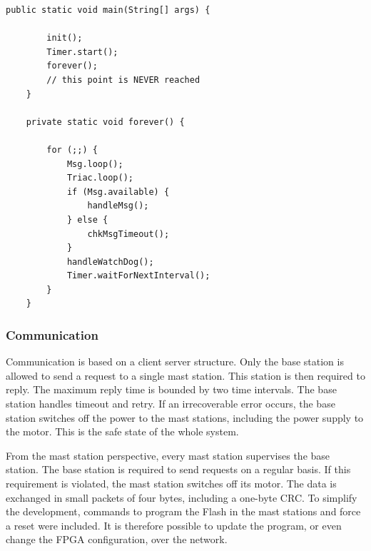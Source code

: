 \begin{lstlisting}[float,caption=Simplified program structure,
label=lst:results:main]
    public static void main(String[] args) {

        init();
        Timer.start();
        forever();
        // this point is NEVER reached
    }

    private static void forever() {

        for (;;) {
            Msg.loop();
            Triac.loop();
            if (Msg.available) {
                handleMsg();
            } else {
                chkMsgTimeout();
            }
            handleWatchDog();
            Timer.waitForNextInterval();
        }
    }
\end{lstlisting}

\subsubsection{Communication}

Communication is based on a client server structure. Only the base
station is allowed to send a request to a single mast station. This
station is then required to reply. The maximum reply time is bounded
by two time intervals. The base station handles timeout and retry.
If an irrecoverable error occurs, the base station switches off the
power to the mast stations, including the power supply to the motor.
This is the safe state of the whole system.

From the mast station perspective, every mast station supervises the
base station. The base station is required to send requests on a
regular basis. If this requirement is violated, the mast station
switches off its motor. The data is exchanged in small packets of
four bytes, including a one-byte CRC. To simplify the development,
commands to program the Flash in the mast stations and force a reset
were included. It is therefore possible to update the program, or
even change the FPGA configuration, over the network.

